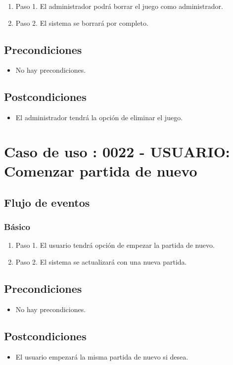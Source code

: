 \begin{enumerate}
\item Paso 1.
El administrador podrá borrar el juego como administrador. 
\item Paso 2.
El sistema se borrará por completo. 
\end{enumerate}

\subsection{Precondiciones}
\begin{itemize}
\item No hay precondiciones.
\end{itemize}

\subsection{Postcondiciones}
\begin{itemize}
\item El administrador tendrá la opción de eliminar el juego.
\end{itemize}



\section{Caso de uso : 0022 - USUARIO: Comenzar partida de nuevo}\label{sec:uc0}
\subsection{Flujo de eventos}
\subsubsection{Básico}

\begin{enumerate}
\item Paso 1.
El usuario tendrá opción de empezar la partida de nuevo. 
\item Paso 2.
El sistema se actualizará con una nueva partida. 
\end{enumerate}

\subsection{Precondiciones}
\begin{itemize}
\item No hay precondiciones.
\end{itemize}

\subsection{Postcondiciones}
\begin{itemize}
\item El usuario empezará la misma partida de nuevo si desea. 
\end{itemize}


